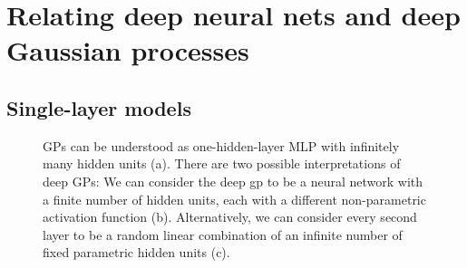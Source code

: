 \documentclass[twoside]{article}
\makeatletter
\newlength{\nonHumbleHeight}
\def\@humbleformat#1{{\settoheight{\nonHumbleHeight}{#1}\resizebox{!}{0.94\nonHumbleHeight}{#1}}}%
\newcommand\humble[1]{{\@humbleformat{#1}}}%
\newcommand{\gp}{{\humble{GP}}}
\newcommand{\gpt}{{\sc gp}}
\newcommand{\sectiondist}{}
\makeatother
\begin{document}







\section{Relating deep neural nets and deep Gaussian processes}
\label{sec:relating}
\sectiondist


\subsection{Single-layer models}

\begin{figure}

\caption{%
GPs can be understood as one-hidden-layer MLP with infinitely many hidden units (a).
There are two possible interpretations of deep GPs:
We can consider the deep \gpt{} to be a neural network with a finite number of hidden units, each with a different non-parametric activation function (b).
Alternatively, we can consider every second layer to be a random linear combination of an infinite number of fixed parametric hidden units (c).
}
\label{fig:architectures}
\end{figure}
\end{document}

